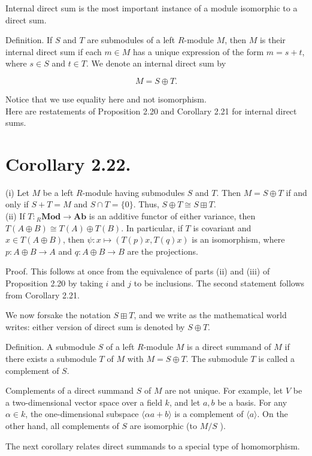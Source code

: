 \documentclass[10pt]{article}
\begin{document}
Internal direct sum is the most important instance of a module isomorphic to a direct sum.

Definition. If $S$ and $T$ are submodules of a left $R$-module $M$, then $M$ is their internal direct sum if each $m \in M$ has a unique expression of the form $m=s+t$, where $s \in S$ and $t \in T$. We denote an internal direct sum by

$$
M=S \oplus T .
$$

Notice that we use equality here and not isomorphism.\\
Here are restatements of Proposition 2.20 and Corollary 2.21 for internal direct sums.

\section*{Corollary 2.22.}
(i) Let $M$ be a left $R$-module having submodules $S$ and $T$. Then $M=S \oplus T$ if and only if $S+T=M$ and $S \cap T=\{0\}$. Thus, $S \oplus T \cong S \boxplus T$.\\
(ii) If $T:{ }_{R} \mathbf{M o d} \rightarrow \mathbf{A b}$ is an additive functor of either variance, then $T(A \oplus B) \cong T(A) \oplus T(B)$. In particular, if $T$ is covariant and $x \in T(A \oplus B)$, then $\psi: x \mapsto(T(p) x, T(q) x)$ is an isomorphism, where $p: A \oplus B \rightarrow A$ and $q: A \oplus B \rightarrow B$ are the projections.

Proof. This follows at once from the equivalence of parts (ii) and (iii) of Proposition 2.20 by taking $i$ and $j$ to be inclusions. The second statement follows from Corollary 2.21.

We now forsake the notation $S \boxplus T$, and we write as the mathematical world writes: either version of direct sum is denoted by $S \oplus T$.

Definition. A submodule $S$ of a left $R$-module $M$ is a direct summand of $M$ if there exists a submodule $T$ of $M$ with $M=S \oplus T$. The submodule $T$ is called a complement of $S$.

Complements of a direct summand $S$ of $M$ are not unique. For example, let $V$ be a two-dimensional vector space over a field $k$, and let $a, b$ be a basis. For any $\alpha \in k$, the one-dimensional subspace $\langle\alpha a+b\rangle$ is a complement of $\langle a\rangle$. On the other hand, all complements of $S$ are isomorphic (to $M / S$ ).

The next corollary relates direct summands to a special type of homomorphism.
\end{document}
